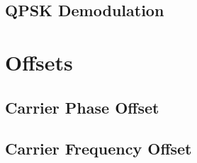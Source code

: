 \documentclass[]{article}
\begin{document}
\subsection{QPSK Demodulation}
\label{app:qpsk_demod}


\newpage
\section{Offsets}
\label{app:offsets}
\subsection{Carrier Phase Offset}
\label{app:phase_offset}


\newpage
\subsection{Carrier Frequency Offset}
\label{app:freq_offset}

\end{document}
